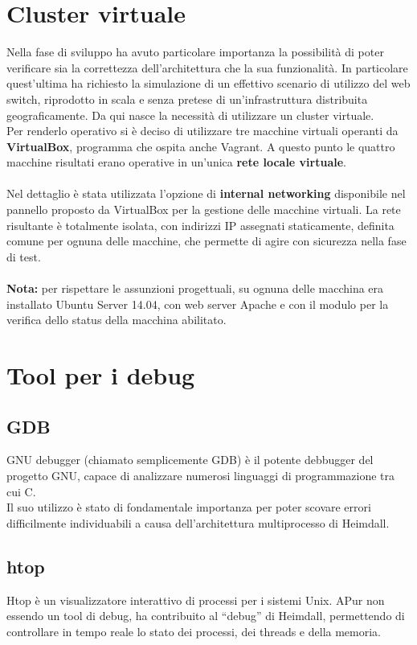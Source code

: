 \documentclass[italian]{tktltiki2}
\begin{document}
\newpage
\section{Cluster virtuale}
Nella fase di sviluppo ha avuto particolare importanza la possibilità di poter verificare sia la correttezza dell'architettura che la sua funzionalità. In particolare quest'ultima ha richiesto la simulazione di un effettivo scenario di utilizzo del web switch, riprodotto in scala e senza pretese di un'infrastruttura distribuita geograficamente. Da qui nasce la necessità di utilizzare un cluster virtuale.\\
Per renderlo operativo si è deciso di utilizzare tre macchine virtuali operanti da \textbf{VirtualBox}\cite{virtualbox}, programma che ospita anche Vagrant. A questo punto le quattro macchine risultati erano operative in un'unica \textbf{rete locale virtuale}. \\\\
Nel dettaglio è stata utilizzata l'opzione di \textbf{internal networking} disponibile nel pannello proposto da VirtualBox per la gestione delle macchine virtuali. La rete risultante è totalmente isolata, con indirizzi IP assegnati staticamente, definita comune per ognuna delle macchine, che permette di agire con sicurezza nella fase di test. \\\\
\textbf{Nota: } per rispettare le assunzioni progettuali, su ognuna delle macchina era installato Ubuntu Server 14.04, con web server Apache e con il modulo per la verifica dello status della macchina abilitato.

\newpage
\section{Tool per i debug}
\subsection{GDB}
GNU debugger (chiamato semplicemente GDB)\cite{gdb} è il potente debbugger del progetto GNU, capace di analizzare numerosi linguaggi di programmazione tra cui C.
\\
Il suo utilizzo è stato di fondamentale importanza per poter scovare errori difficilmente individuabili a causa dell'architettura multiprocesso di Heimdall.

\subsection{htop}
Htop\cite{htop} è un visualizzatore interattivo di processi per i sistemi Unix. APur non essendo un tool di debug, ha contribuito al ``debug'' di Heimdall, permettendo di controllare in tempo reale lo stato dei processi, dei threads e della memoria.
\end{document}
